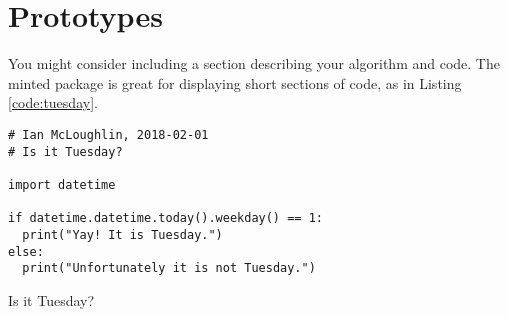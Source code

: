 \chapter{Prototypes}
You might consider including a section describing your algorithm and code.
The minted package is great for displaying short sections of code, as in 
Listing \ref{code:tuesday}.

\lipsum[29]

\begin{listing}
  \begin{verbatim}
# Ian McLoughlin, 2018-02-01
# Is it Tuesday?

import datetime

if datetime.datetime.today().weekday() == 1:
  print("Yay! It is Tuesday.")
else:
  print("Unfortunately it is not Tuesday.")
  \end{verbatim}
  \caption{Is it Tuesday?}
  \label{code:tuesday}
\end{listing}

\lipsum[10-15]